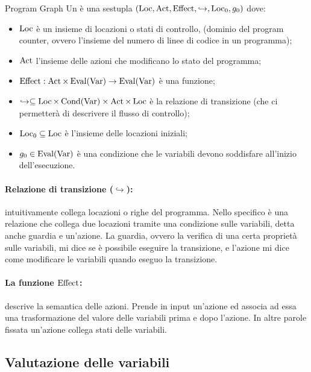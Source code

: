 \begin{definition}{Program Graph}
  Un  è una sestupla \((\operatorname{Loc},\operatorname{Act},\operatorname{Effect},\hookrightarrow , \operatorname{Loc}_0, g_0)\) dove:
  \begin{itemize}
    \item \(\operatorname{Loc}\) è un insieme di locazioni o stati di controllo, (dominio del program counter, ovvero l'insieme del numero di linee di codice in un programma);
    \item \(\operatorname{Act}\) l'insieme delle azioni che modificano lo stato del programma;
    \item \(\operatorname{Effect} : \operatorname{Act}\times \operatorname{Eval}(\operatorname{Var}) \to \operatorname{Eval}(\operatorname{Var})\) è una funzione;
    \item \(\hookrightarrow \subseteq \operatorname{Loc} \times \operatorname{Cond}(\operatorname{Var}) \times \operatorname{Act} \times \operatorname{Loc}\) è la relazione di transizione (che ci permetterà di descrivere il flusso di controllo);
    \item \(\operatorname{Loc}_0 \subseteq \operatorname{Loc}\) è l'insieme delle locazioni iniziali;
    \item \(g_0 \in \operatorname{Eval}(\operatorname{Var})\) è una condizione che le variabili devono soddisfare all'inizio dell'esecuzione.
  \end{itemize}
\end{definition}

\paragraph{Relazione di transizione (\(\hookrightarrow\)):} intuitivamente collega  locazioni o righe del programma. Nello specifico è una relazione che collega due locazioni tramite una condizione sulle variabili, detta anche guardia e un'azione.
La guardia, ovvero la verifica di una certa proprietà sulle variabili, mi dice se è possibile eseguire la transizione, e l'azione mi dice come modificare le variabili quando eseguo la transizione.

\paragraph{La funzione \(\operatorname{Effect}\):} descrive la semantica delle azioni. Prende in input un'azione ed associa ad essa una trasformazione del valore delle variabili prima e dopo l'azione. In altre parole fissata un'azione collega  stati delle variabili.


\subsection{Valutazione delle variabili}

